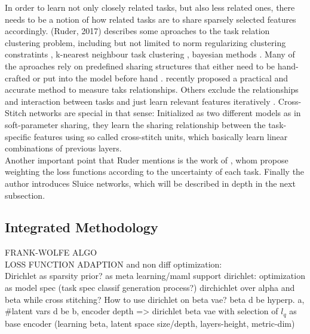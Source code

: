 In order to learn not only closely related tasks, but also less related ones, there needs to be a notion of how related tasks are to share sparsely selected features accordingly. (Ruder, 2017) describes some aproaches to the task relation clustering problem, including but not limited to norm regularizing clustering constratints \cite{evgeniou2005learning}, k-nearest neighbour task clustering \cite{thrun1996discovering}, bayesian methods \cite{heskes2000empirical}. Many of the aproaches rely on predefined sharing structures that either need to be hand-crafted or put into the model before hand \cite{DBLP:journals/corr/Long015a}. \cite{DBLP:journals/corr/abs-1804-08328} recently proposed a practical and accurate method to measure taks relationships. Others exclude the relationships and interaction between tasks and just learn relevant features iteratively \cite{DBLP:journals/corr/LuKZCJF16}. Cross-Stitch networks are special in that sense: Initialized as two different models as in soft-parameter sharing, they learn the sharing relationship between the task-specific features using so called cross-stitch units, which basically learn linear combinations of previous layers. \\
Another important point that Ruder mentions is the work of \cite{DBLP:journals/corr/KendallGC17}, whom propose weighting the loss functions according to the uncertainty of each task. Finally the author introduces Sluice networks, which will be described in depth in the next subsection.

\subsection{Integrated Methodology}

FRANK-WOLFE ALGO\\

LOSS FUNCTION ADAPTION and non diff optimization:\\


Dirichlet as sparsity prior? as meta learning/maml support dirichlet: optimization as model spec (task spec classif generation process?)
 dirchichlet over alpha and beta while cross stitching?
How to use dirichlet on beta vae? beta d be hyperp. a, \#latent vars d be b, encoder depth => dirichlet beta vae with selection of $l_q$ as base encoder (learning beta, latent space size/depth, layers-height, metric-dim)


